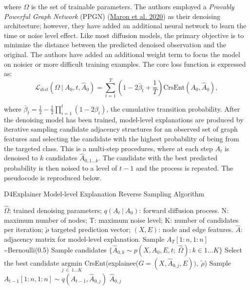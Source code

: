 \documentclass[
  11pt,
  letterpaper,
]{article}
\begin{document}
where \(\Omega\) is the set of trainable parameters. The authors
employed a \emph{Provably Powerful Graph Network} (PPGN)
(\protect\hyperlink{ref-Maron_Ben-Hamu_Serviansky_Lipman_2020}{Maron et
al. 2020}) as their denoising architecture; however, they have added an
additional neural network to learn the time or noise level effect. Like
most diffusion models, the primary objective is to minimize the distance
between the predicted denoised observation and the original. The authors
have added an additional weight term to focus the model on noisier or
more difficult training examples. The core loss function is expressed
as: \begin{equation} \label{L-dist}
    \mathcal{L}_{dist} (\Omega \ | \ A_0, t, \hat A_0) = \sum_{t=1}^T \left(1 - 2 \bar \beta_t + \dfrac 1 T \right) \text{CrsEnt} \left(A_0, \hat A_0 \right), 
\end{equation}

where
\(\bar \beta_t = \frac 1 2 - \frac 1 2 \prod^t_{i=1}(1-2\beta_i)\), the
cumulative transition probability. After the denoising model has been
trained, model-level explanations are produced by iterative sampling
candidate adjacency structures for an observed set of graph features and
selecting the candidate with the highest probability of being from the
targeted class. This is a multi-step procedures, where at each step
\(A_t\) is denoised to \(k\) candidates \(\hat A_{0, 1 \dots k}\). The
candidate with the best predicted probability is then noised to a level
of \(t-1\) and the process is repeated. The pseudocode is reproduced
below.

\begin{algorithm}
\caption{D4Explainer Model-level Explanation Reverse Sampling Algorithm}\label{alg:cap}
\begin{algorithmic}
    \Require $\hat \Omega$: trained denoising parameters; 
            $q(A_t \ | \ A_0)$: forward diffusion process.
    \renewcommand{\algorithmicrequire}{\textbf{Input:}}
    \renewcommand{\algorithmicensure}{\textbf{Output:}}
    \Require N: maximum number of nodes; T: maximum noise level; 
            K: number of candidates per iteration; 
            $\tilde{\rho}$ targeted prediction vector; 
            $(X, E)$: node and edge features.  
    \Ensure $\hat A$: adjacency matrix for model-level explanation.
    \State Sample $A_T[1:n, 1:n]$ \sim Bernoulli(0.5)
        \State Sample candidates 
            $\{\hat A_{0, k} \sim p(X, A_0, E, t; \ \hat \Omega) : k \in 1 \dots K\}$
        \State Select the best candidate 
        $\underset{j \ \in \ 1 \dots K}{\text{argmin}}$ 
        CrsEnt(explainee($G = (X, \hat A_{0, j}, E)), \ \tilde{\rho}$)
        \State Sample $A_{t-1}[1:n, 1:n] \sim q(A_{t-1}, \hat A_{0, j})$
    \EndFor
    \State \Return $\hat A_{0, j}$
\end{algorithmic}
\end{algorithm}
\end{document}
